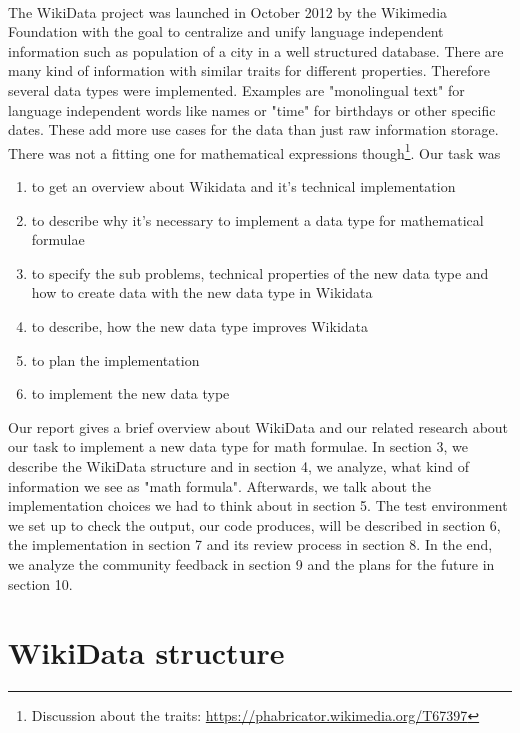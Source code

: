 \documentclass[12pt]{article}
\begin{document}
\paragraph{}
The WikiData project was launched in October 2012 by the Wikimedia Foundation with the goal to centralize and unify language independent information such as population of a city in a well structured database. %
There are many kind of information with similar traits for different properties. Therefore several data types were implemented. Examples are "monolingual text" for language independent words like names or "time" for birthdays or other specific dates. These add more use cases for the data than just raw information storage. There was not a fitting one for mathematical expressions though\footnote{Discussion about the traits:  \url{https://phabricator.wikimedia.org/T67397}}. Our task was
\begin{enumerate}
\item to get an overview about Wikidata and it's technical implementation
\item to describe why it's necessary to implement a data type for mathematical formulae
\item to specify the sub problems, technical properties of the new data type and how to create data with the new data type in Wikidata
\item to describe, how the new data type improves Wikidata
\item to plan the implementation 
\item to implement the new data type
\end{enumerate}

Our report gives a brief overview about WikiData and our related research about our task to implement a new data type for math formulae. In section 3, we describe the WikiData structure and in section 4, we analyze, what kind of information we see as "math formula". Afterwards, we talk about the implementation choices we had to think about in section 5. The test environment we set up to check the output, our code produces, will be described in section 6, the implementation in section 7 and its review process in section 8. In the end, we analyze the community feedback in section 9 and the plans for the future in section 10.

\section{WikiData structure}
\end{document}
